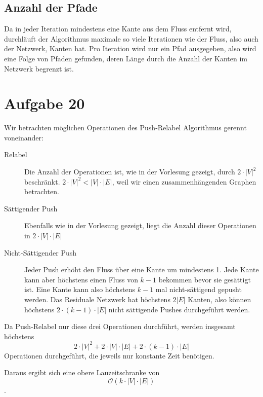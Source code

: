 \documentclass[parskip=half,a4paper]{scrartcl}
\begin{document}
\subsection*{Anzahl der Pfade}

Da in jeder Iteration mindestens eine Kante aus dem Fluss entfernt wird, durchläuft der Algorithmus maximale so viele Iterationen wie der Fluss, also auch der Netzwerk, Kanten hat. Pro Iteration wird nur ein Pfad ausgegeben, also wird eine Folge von Pfaden gefunden, deren Länge durch die Anzahl der Kanten im Netzwerk begrenzt ist.

\section*{Aufgabe 20}

Wir betrachten möglichen Operationen des Push-Relabel Algorithmus gerennt voneinander:

\begin{description}
\item [Relabel] Die Anzahl der Operationen ist, wie in der Vorlesung gezeigt, durch $2 \cdot |V|^2$ beschränkt. $2 \cdot |V|^2 < |V| \cdot |E|$, weil wir einen zusammenhängenden Graphen betrachten.
\item [Sättigender Push] Ebenfalls wie in der Vorlesung gezeigt, liegt die Anzahl dieser Operationen in $2 \cdot |V| \cdot |E|$
\item [Nicht-Sättigender Push] Jeder Push erhöht den Fluss über eine Kante um mindestens 1. Jede Kante kann aber höchstens einen Fluss von $k-1$ bekommen bevor sie gesättigt ist. Eine Kante kann also höchstens $k-1$ mal nicht-sättigend gepusht werden. Das Residuale Netzwerk hat höchstens $2|E|$ Kanten, also können höchstens $2 \cdot (k-1) \cdot |E|$ nicht sättigende Pushes durchgeführt werden.
\end{description}

Da Push-Relabel nur diese drei Operationen durchführt, werden insgesamt höchstens $$2 \cdot |V|^2 + 2 \cdot |V| \cdot |E| + 2 \cdot (k-1) \cdot |E|$$ Operationen durchgeführt, die jeweils nur konstante Zeit benötigen.

Daraus ergibt sich eine obere Lauzeitschranke von $$\mathcal{O}(k \cdot |V| \cdot |E|)$$.
\end{document}
